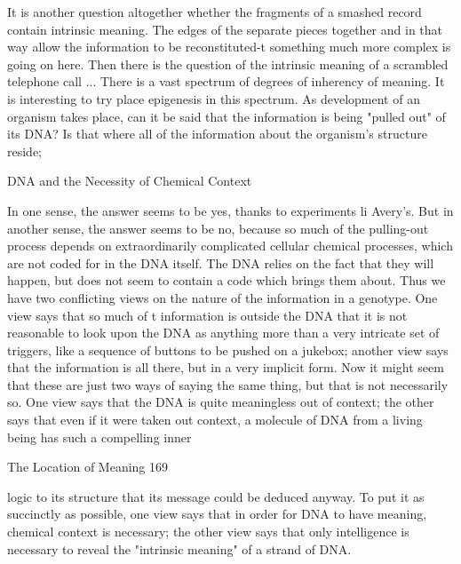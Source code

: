 It is another question altogether whether the fragments of a smashed record contain
intrinsic meaning. The edges of the separate pieces together and in that way allow the
information to be reconstituted-t something much more complex is going on here. Then
there is the question of the intrinsic meaning of a scrambled telephone call ... There is a
vast spectrum of degrees of inherency of meaning. It is interesting to try place epigenesis
in this spectrum. As development of an organism takes place, can it be said that the
information is being "pulled out" of its DNA? Is that where all of the information about
the organism's structure reside;

                  DNA and the Necessity of Chemical Context

In one sense, the answer seems to be yes, thanks to experiments li Avery's. But in another
sense, the answer seems to be no, because so much of the pulling-out process depends on
extraordinarily complicated cellular chemical processes, which are not coded for in the
DNA itself. The DNA relies on the fact that they will happen, but does not seem to
contain a code which brings them about. Thus we have two conflicting views on the
nature of the information in a genotype. One view says that so much of t information is
outside the DNA that it is not reasonable to look upon the DNA as anything more than a
very intricate set of triggers, like a sequence of buttons to be pushed on a jukebox;
another view says that the information is all there, but in a very implicit form.
        Now it might seem that these are just two ways of saying the same thing, but that
is not necessarily so. One view says that the DNA is quite meaningless out of context; the
other says that even if it were taken out context, a molecule of DNA from a living being
has such a compelling inner




The Location of Meaning                                                                169

logic to its structure that its message could be deduced anyway. To put it as succinctly as
possible, one view says that in order for DNA to have meaning, chemical context is
necessary; the other view says that only intelligence is necessary to reveal the "intrinsic
meaning" of a strand of DNA.

